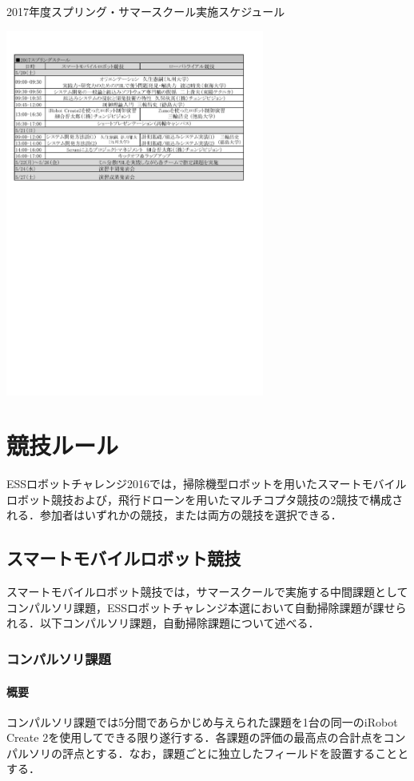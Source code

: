 \documentclass[submit]{ipsj}
\begin{document}
\begin{table}[ht]
\caption{2017年度スプリング・サマースクール実施スケジュール}
\label{table:schedule}
\centering
\includegraphics[width=8.5cm]{images/schedule.pdf}
\end{table}

\section{競技ルール}

ESSロボットチャレンジ2016では，掃除機型ロボットを用いたスマートモバイルロボット競技および，飛行ドローンを用いたマルチコプタ競技の2競技で構成される．参加者はいずれかの競技，または両方の競技を選択できる．

\subsection{スマートモバイルロボット競技}
スマートモバイルロボット競技では，サマースクールで実施する中間課題としてコンパルソリ課題，ESSロボットチャレンジ本選において自動掃除課題が課せられる．以下コンパルソリ課題，自動掃除課題について述べる．

\subsubsection{コンパルソリ課題}
\paragraph*{概要}
コンパルソリ課題では5分間であらかじめ与えられた課題を1台の同一のiRobot Create 2を使用してできる限り遂行する．各課題の評価の最高点の合計点をコンパルソリの評点とする．なお，課題ごとに独立したフィールドを設置することとする．
\end{document}
